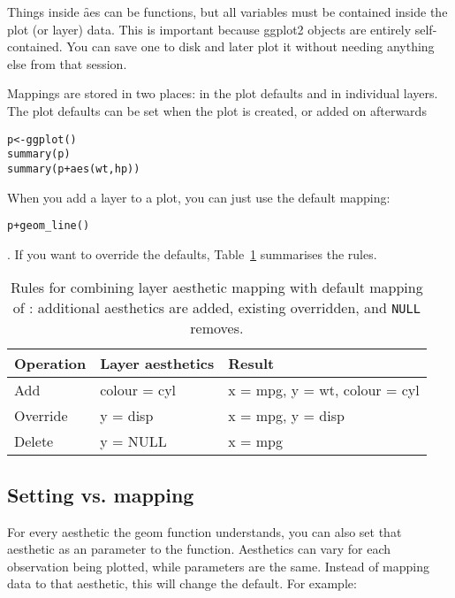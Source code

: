 Things inside \f{aes} can be functions, but all variables must be contained inside the plot (or layer) data.  This is important because ggplot2 objects are entirely self-contained.  You can save one to disk and later plot it without needing anything else from that session.

Mappings are stored in two places: in the plot defaults and in individual layers.  The plot defaults can be set when the plot is created, or added on afterwards

\begin{alltt}
p <- ggplot()
summary(p)
summary(p + aes(wt, hp))
\end{alltt}

When you add a layer to a plot, you can just use the default mapping: 

\begin{alltt}
p + geom_line()
\end{alltt}

\noindent.  If you want to override the defaults, Table~\ref{tbl:aes-override} summarises the rules.

\begin{table}
  \begin{center}
  \begin{tabular}{lll}
    \toprule
    Operation & Layer aesthetics  & Result \\
    \midrule
    Add       & colour = cyl & x = mpg, y = wt, colour = cyl \\
    Override  & y = disp     & x = mpg, y = disp \\
    Delete    & y = NULL     & x = mpg \\
    \bottomrule
  \end{tabular}
  \end{center}
  \caption{Rules for combining layer aesthetic mapping with default mapping of :  additional aesthetics are added, existing overridden, and {\tt NULL} removes.}
  \label{tbl:aes-override}
\end{table}


\subsection{Setting vs. mapping}
\label{sub:setting-mapping}

For every aesthetic the geom function understands, you can also set that aesthetic as an parameter to the function.  Aesthetics can vary for each observation being plotted, while parameters are the same.  Instead of mapping data to that aesthetic, this will change the default.  For example:

